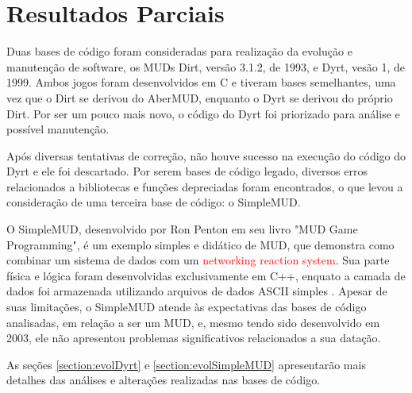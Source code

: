 \chapter[Resultados Parciais]{Resultados Parciais}

Duas bases de código foram consideradas para realização da evolução e manutenção de software, os MUDs 
Dirt, versão 3.1.2, de 1993, e Dyrt, vesão 1, de 1999.  Ambos jogos foram desenvolvidos em C e tiveram 
bases semelhantes, uma vez que o Dirt se derivou do AberMUD, enquanto o Dyrt se derivou do próprio Dirt. 
Por ser um pouco mais novo, o código do Dyrt foi priorizado para análise e possível manutenção.

Após diversas tentativas de correção, não houve sucesso na execução do código do Dyrt e ele foi descartado. 
Por serem bases de código legado, diversos erros relacionados a bibliotecas e funções depreciadas foram 
encontrados, o que levou a consideração de uma terceira base de código: o SimpleMUD.

O SimpleMUD, desenvolvido por Ron Penton em seu livro "MUD Game Programming", é um exemplo simples e 
didático de MUD, que demonstra como combinar um sistema de dados com um \textcolor{red}{networking reaction system}. 
Sua parte física e lógica foram desenvolvidas exclusivamente em C++, enquato a camada de dados foi armazenada 
utilizando arquivos de dados ASCII simples \cite{penton2003mud}. Apesar de suas limitações, o SimpleMUD 
atende às expectativas das bases de código analisadas, em relação a ser um MUD, e, mesmo tendo sido 
desenvolvido em 2003, ele não apresentou problemas significativos relacionados a sua datação.

As seções \ref{section:evolDyrt} e \ref{section:evolSimpleMUD} apresentarão mais detalhes das análises e alterações realizadas nas bases de código.